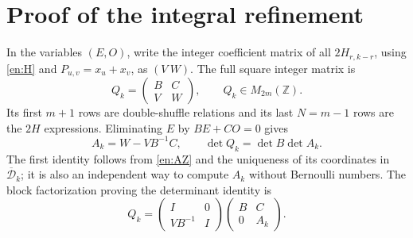 \documentclass[12pt]{amsart}
\theoremstyle{definition}
\theoremstyle{remark}
\numberwithin{equation}{section}
\newcommand{\Z}{\mathbb{Z}}
\newcommand{\Dbar}{\overline{\mathcal D}_k}
\theoremstyle{definition}
\theoremstyle{remark}
\begin{document}
\section{Proof of the integral refinement}
In the variables $(E,O)$, write the integer coefficient matrix of all
$2H_{r,k-r}$, using \eqref{en:H} and $P_{u,v}=x_u+x_v$, as $(V\ W)$.
The full square integer matrix is
\begin{equation}\label{en:Q}
 Q_k=\begin{pmatrix}B&C\\V&W\end{pmatrix},\qquad
 Q_k\in M_{2m}(\Z).
\end{equation}
Its first $m+1$ rows are double-shuffle relations and its last $N=m-1$
rows are the $2H$ expressions. Eliminating $E$ by $BE+CO=0$ gives
\begin{equation}\label{en:schur}
 A_k=W-VB^{-1}C,\qquad \det Q_k=\det B\det A_k.
\end{equation}
The first identity follows from \eqref{en:AZ} and the uniqueness of its
coordinates in $\Dbar$; it is also an independent way to compute $A_k$
without Bernoulli numbers. The block factorization proving the determinant
identity is
\[
 Q_k=\begin{pmatrix}I&0\\VB^{-1}&I\end{pmatrix}
     \begin{pmatrix}B&C\\0&A_k\end{pmatrix}.
\]
\end{document}
